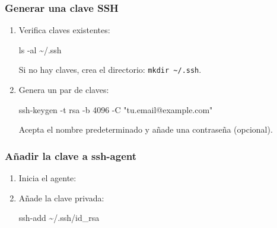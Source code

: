 \documentclass[
  doc,
  floatsintext,
  longtable,
  a4paper,
  nolmodern,
  notxfonts,
  notimes,
  colorlinks=true,linkcolor=blue,citecolor=blue,urlcolor=blue]{apa7}
\newenvironment{Shaded}{\begin{snugshade}}{\end{snugshade}}
\newcommand{\AttributeTok}[1]{\textcolor[rgb]{0.40,0.45,0.13}{#1}}
\newcommand{\BuiltInTok}[1]{\textcolor[rgb]{0.00,0.23,0.31}{#1}}
\newcommand{\FunctionTok}[1]{\textcolor[rgb]{0.28,0.35,0.67}{#1}}
\newcommand{\NormalTok}[1]{\textcolor[rgb]{0.00,0.23,0.31}{#1}}
\newcommand{\StringTok}[1]{\textcolor[rgb]{0.13,0.47,0.30}{#1}}
\newcommand{\VariableTok}[1]{\textcolor[rgb]{0.07,0.07,0.07}{#1}}
\begin{document}
\subsubsection{Generar una clave SSH}\label{generar-una-clave-ssh}

\begin{enumerate}
\def\labelenumi{\arabic{enumi}.}
\item
  Verifica claves existentes:

\begin{Shaded}
\begin{Highlighting}[]
\FunctionTok{ls} \AttributeTok{{-}al}\NormalTok{ \textasciitilde{}/.ssh}
\end{Highlighting}
\end{Shaded}

  Si no hay claves, crea el directorio:
  \texttt{mkdir\ \textasciitilde{}/.ssh}.
\item
  Genera un par de claves:

\begin{Shaded}
\begin{Highlighting}[]
\FunctionTok{ssh{-}keygen} \AttributeTok{{-}t}\NormalTok{ rsa }\AttributeTok{{-}b}\NormalTok{ 4096 }\AttributeTok{{-}C} \StringTok{"tu.email@example.com"}
\end{Highlighting}
\end{Shaded}

  Acepta el nombre predeterminado y añade una contraseña (opcional).
\end{enumerate}

\subsubsection{Añadir la clave a
ssh-agent}\label{auxf1adir-la-clave-a-ssh-agent}

\begin{enumerate}
\def\labelenumi{\arabic{enumi}.}
\item
  Inicia el agente:

\begin{Shaded}
\end{Shaded}
\item
  Añade la clave privada:

\begin{Shaded}
\begin{Highlighting}[]
\FunctionTok{ssh{-}add}\NormalTok{ \textasciitilde{}/.ssh/id\_rsa}
\end{Highlighting}
\end{Shaded}
\end{enumerate}
\end{document}
